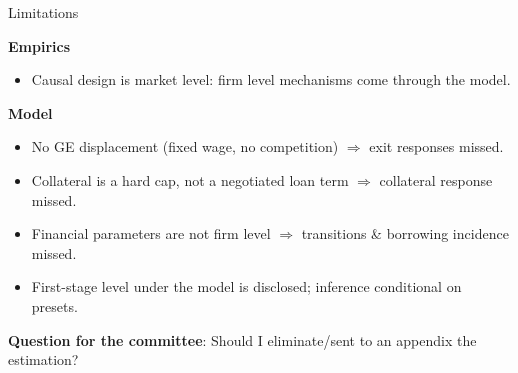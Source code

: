 \documentclass[aspectratio=169]{beamer}
\begin{document}
 
\begin{frame}{Limitations}
 
\textbf{Empirics}
\begin{itemize}
    \item Causal design is market level: firm level mechanisms come through the model.
\end{itemize}
 
\vspace{2mm}
\textbf{Model}
\begin{itemize}
    \item No GE displacement (fixed wage, no competition) $\Rightarrow$ exit responses missed.
    \item Collateral is a hard cap, not a negotiated loan term $\Rightarrow$ collateral response missed.
    \item Financial parameters are not firm level $\Rightarrow$ transitions \& borrowing incidence missed.
    \item First-stage level under the model is disclosed; inference conditional on presets.
\end{itemize}

\vspace{5mm}

\textbf{Question for the committee}: Should I eliminate/sent to an appendix the estimation? 

\end{frame}
 
 
\end{document}
